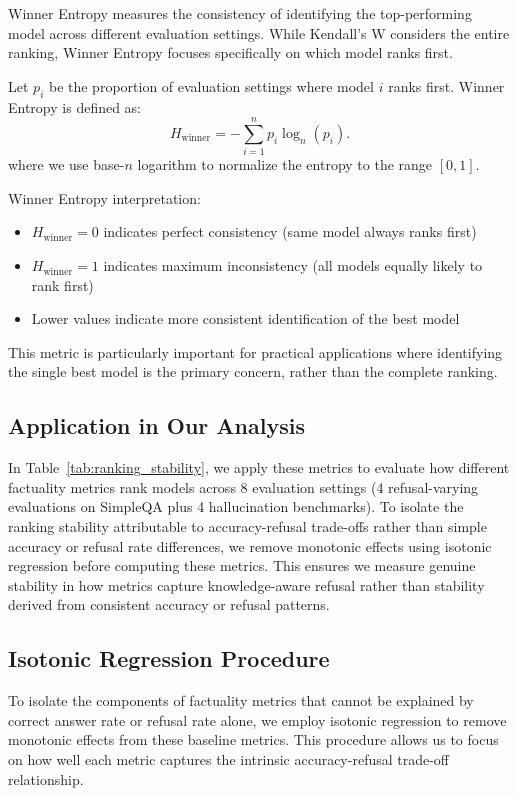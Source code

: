 Winner Entropy measures the consistency of identifying the top-performing model across different evaluation settings. While Kendall's W considers the entire ranking, Winner Entropy focuses specifically on which model ranks first.

Let $p_i$ be the proportion of evaluation settings where model $i$ ranks first. Winner Entropy is defined as:
\[
H_{\text{winner}} = -\sum_{i=1}^{n} p_i \log_n(p_i).
\]
where we use base-$n$ logarithm to normalize the entropy to the range $[0, 1]$.

Winner Entropy interpretation:
\begin{itemize}
    \item $H_{\text{winner}} = 0$ indicates perfect consistency (same model always ranks first)
    \item $H_{\text{winner}} = 1$ indicates maximum inconsistency (all models equally likely to rank first)
    \item Lower values indicate more consistent identification of the best model
\end{itemize}

This metric is particularly important for practical applications where identifying the single best model is the primary concern, rather than the complete ranking.

\subsection{Application in Our Analysis}

In Table~\ref{tab:ranking_stability}, we apply these metrics to evaluate how different factuality metrics rank models across 8 evaluation settings (4 refusal-varying evaluations on SimpleQA plus 4 hallucination benchmarks). To isolate the ranking stability attributable to accuracy-refusal trade-offs rather than simple accuracy or refusal rate differences, we remove monotonic effects using isotonic regression before computing these metrics. This ensures we measure genuine stability in how metrics capture knowledge-aware refusal rather than stability derived from consistent accuracy or refusal patterns.

\subsection{Isotonic Regression Procedure}

To isolate the components of factuality metrics that cannot be explained by correct answer rate or refusal rate alone, we employ isotonic regression to remove monotonic effects from these baseline metrics. This procedure allows us to focus on how well each metric captures the intrinsic accuracy-refusal trade-off relationship.

